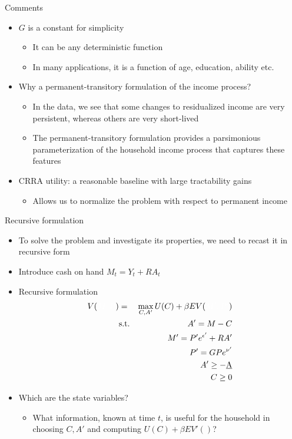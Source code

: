 \documentclass[9pt]{beamer}
\newcommand{\bit}{\begin{itemize}}
\newcommand{\eit}{\end{itemize}}
\begin{document}
\begin{frame}{Comments}

\bit
\setlength\itemsep{1.5em}

\item $G$ is a constant for simplicity
\bit
\setlength\itemsep{0.5em}
	\item It can be any deterministic function
	
	\item In many applications, it is a function of age, education, ability etc.
\eit

\item Why a permanent-transitory formulation of the income process?
\bit
\setlength\itemsep{0.5em}
\item In the data, we see that some changes to residualized income are very persistent, whereas others are very short-lived

\item The permanent-transitory formulation provides a parsimonious parameterization of the household income process that captures these features
\eit

\item CRRA utility: a reasonable baseline with large tractability gains
\bit
\item Allows us to normalize the problem with respect to permanent income
\eit

\eit

\end{frame}


\begin{frame}{Recursive formulation}

\bit
\setlength\itemsep{1em}

\item To solve the problem and investigate its properties, we need to recast it in recursive form

\item Introduce cash on hand $M_t = Y_t + RA_t$

\item Recursive formulation
\begin{eqnarray}
V({\color{white}M, P}) &=& \max_{C, A'} U(C) + \beta E V({\color{white}M', P'}) \nonumber \\
&\text{s.t.}& A'=M-C \nonumber \\
&& M' = P'e^{\epsilon'} + RA' \nonumber \\
&& P' = GPe^{\nu'} \nonumber \\
&& A'\geq -\underbar A \nonumber \\
&& C\geq 0 \nonumber
\end{eqnarray}

\item Which are the state variables?
\bit
\item What information, known at time $t$, is useful for the household in choosing $C, A'$ and computing $U(C)+\beta E V'()$?
\eit

\eit

\end{frame}
\end{document}
